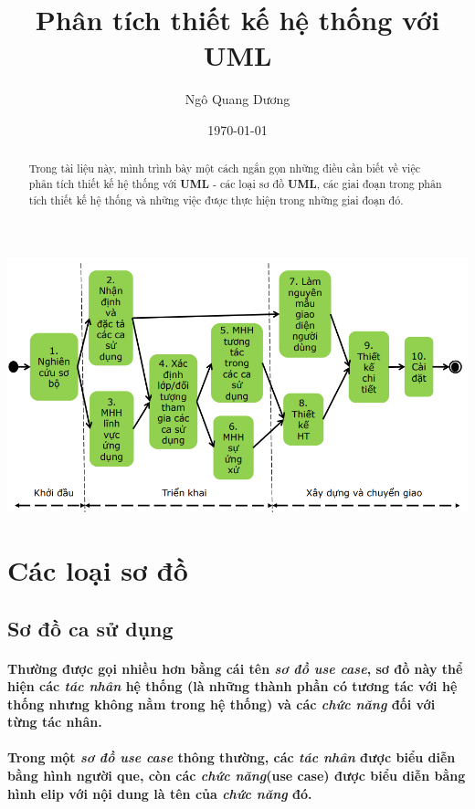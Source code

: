 \documentclass{article}
\title{\textbf{Phân tích thiết kế hệ thống với UML}}
\author{Ngô Quang Dương}
\date{\today}
\begin{document}
\maketitle

\begin{abstract}Trong tài liệu này, mình trình bày một cách ngắn gọn những điều cần biết về việc phân tích thiết kế hệ thống với \textbf{UML} - các loại sơ đồ \textbf{UML}, các giai đoạn trong phân tích thiết kế hệ thống và những việc được thực hiện trong những giai đoạn đó.
\end{abstract}

\tableofcontents

\begin{center}
  \includegraphics[scale=0.6]{../pictures/rup.PNG}
\end{center}

\section{Các loại sơ đồ}
  
  \subsection{Sơ đồ ca sử dụng}
  
  \paragraph{\textnormal{Thường được gọi nhiều hơn bằng cái tên \textit{sơ đồ use case}, sơ đồ này thể hiện các \textit{tác nhân} hệ thống (là những thành phần có tương tác với hệ thống nhưng không nằm trong hệ thống) và các \textit{chức năng} đối với từng tác nhân.}}

  \paragraph{\textnormal{Trong một \textit{sơ đồ use case} thông thường, các \textit{tác nhân} được biểu diễn bằng hình người que, còn các \textit{chức năng}(use case) được biểu diễn bằng hình elip với nội dung là tên của \textit{chức năng} đó.}}
\end{document}
